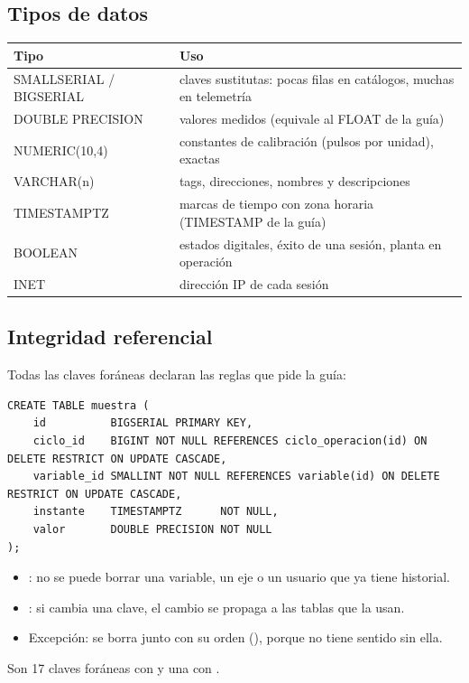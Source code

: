 \documentclass[a4paper,11pt]{article}
\begin{document}
\subsection{Tipos de datos}
\begin{center}\small
\begin{tabularx}{\linewidth}{>{\ttfamily}p{3.4cm} >{\raggedright\arraybackslash}X}
\toprule
\textrm{\textbf{Tipo}} & \textbf{Uso}\\
\midrule
SMALLSERIAL / BIGSERIAL & claves sustitutas: pocas filas en catálogos, muchas en telemetría\\
DOUBLE PRECISION & valores medidos (equivale al FLOAT de la guía)\\
NUMERIC(10,4) & constantes de calibración (pulsos por unidad), exactas\\
VARCHAR(n) & tags, direcciones, nombres y descripciones\\
TIMESTAMPTZ & marcas de tiempo con zona horaria (TIMESTAMP de la guía)\\
BOOLEAN & estados digitales, éxito de una sesión, planta en operación\\
INET & dirección IP de cada sesión\\
\bottomrule
\end{tabularx}
\end{center}

\subsection{Integridad referencial}
Todas las claves foráneas declaran las reglas que pide la guía:
\begin{lstlisting}[style=sql]
CREATE TABLE muestra (
    id          BIGSERIAL PRIMARY KEY,
    ciclo_id    BIGINT NOT NULL REFERENCES ciclo_operacion(id) ON DELETE RESTRICT ON UPDATE CASCADE,
    variable_id SMALLINT NOT NULL REFERENCES variable(id) ON DELETE RESTRICT ON UPDATE CASCADE,
    instante    TIMESTAMPTZ      NOT NULL,
    valor       DOUBLE PRECISION NOT NULL
);
\end{lstlisting}
\begin{itemize}
\item {}: no se puede borrar una variable, un eje o un usuario que ya tiene historial.
\item {}: si cambia una clave, el cambio se propaga a las tablas que la usan.
\item Excepción:  se borra junto con su orden (), porque no tiene sentido sin ella.
\end{itemize}
Son 17 claves foráneas con  y una con .
\end{document}
